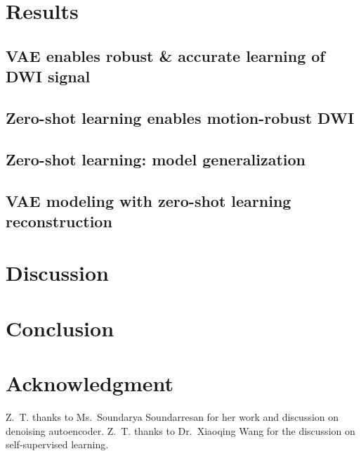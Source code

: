 \documentclass[journal,twoside,web]{ieeecolor}
\begin{document}
	\section{Results}

	\subsection{VAE enables robust \& accurate learning of DWI signal}

	\subsection{Zero-shot learning enables motion-robust DWI}

	\subsection{Zero-shot learning: model generalization}

	\subsection{VAE modeling with zero-shot learning reconstruction}


	\section{Discussion}


	\section{Conclusion}


	\section*{Acknowledgment}

	Z.~T. thanks to Ms.~Soundarya Soundarresan for
	her work and discussion on denoising autoencoder.
	Z.~T. thanks to Dr.~Xiaoqing Wang for
	the discussion on self-supervised learning.

	
	
\end{document}
